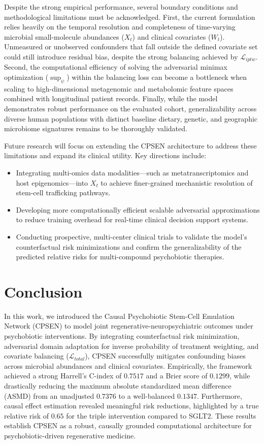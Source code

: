 \documentclass[10pt,twocolumn]{article}
\begin{document}
Despite the strong empirical performance, several boundary conditions and methodological limitations must be acknowledged. First, the current formulation relies heavily on the temporal resolution and completeness of time-varying microbial small-molecule abundances ($X_t$) and clinical covariates ($W_t$). Unmeasured or unobserved confounders that fall outside the defined covariate set could still introduce residual bias, despite the strong balancing achieved by $\mathcal{L}_{iptw}$. Second, the computational efficiency of solving the adversarial minimax optimization ($\sup_{\psi}$) within the balancing loss can become a bottleneck when scaling to high-dimensional metagenomic and metabolomic feature spaces combined with longitudinal patient records. Finally, while the model demonstrates robust performance on the evaluated cohort, generalizability across diverse human populations with distinct baseline dietary, genetic, and geographic microbiome signatures remains to be thoroughly validated.


Future research will focus on extending the CPSEN architecture to address these limitations and expand its clinical utility. Key directions include:
\begin{itemize}
    \item Integrating multi-omics data modalities—such as metatranscriptomics and host epigenomics—into $X_t$ to achieve finer-grained mechanistic resolution of stem-cell trafficking pathways.
    \item Developing more computationally efficient scalable adversarial approximations to reduce training overhead for real-time clinical decision support systems.
    \item Conducting prospective, multi-center clinical trials to validate the model's counterfactual risk minimizations and confirm the generalizability of the predicted relative risks for multi-compound psychobiotic therapies.
\end{itemize}

\section{Conclusion}
In this work, we introduced the Causal Psychobiotic Stem-Cell Emulation Network (CPSEN) to model joint regenerative-neuropsychiatric outcomes under psychobiotic interventions. By integrating counterfactual risk minimization, adversarial domain adaptation for inverse probability of treatment weighting, and covariate balancing ($\mathcal{L}_{total}$), CPSEN successfully mitigates confounding biases across microbial abundances and clinical covariates. Empirically, the framework achieved a strong Harrell's C-index of $0.7517$ and a Brier score of $0.1299$, while drastically reducing the maximum absolute standardized mean difference (ASMD) from an unadjusted $0.7376$ to a well-balanced $0.1347$. Furthermore, causal effect estimation revealed meaningful risk reductions, highlighted by a true relative risk of $0.65$ for the triple intervention compared to SGLT2. These results establish CPSEN as a robust, causally grounded computational architecture for psychobiotic-driven regenerative medicine.



\end{document}
